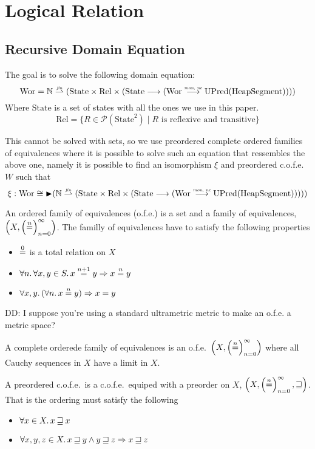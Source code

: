 \documentclass{article}
\newcommand{\finparfun}{\stackrel{\textit{\tiny{fin}}}{\rightharpoonup}}
\newcommand{\monnefun}{\stackrel{\textit{\tiny{mon, ne}}}{\longrightarrow}}
\newcommand{\fun}{\longrightarrow}
\newcommand{\nequal}[1][n]{\stackrel{\tiny{#1}}{=}}
\newcommand{\blater}{\mathop{\blacktriangleright}}
\newcommand{\powerset}[1]{\mathcal{P}(#1)}
\newcommand{\cofe}{c.o.f.e.}
\newcommand{\cofes}{\cofe{}'s}
\newcommand\dominique[1]{{\color{purple} \sf \footnotesize {DD: #1}}\\}
\newcommand{\future}{\mathbin{\sqsupseteq}}
\newcommand{\plaindom}[1]{\mathrm{#1}}
\newcommand{\HeapSegments}{\plaindom{HeapSegment}}
\newcommand{\nats}{\mathbb{N}}
\newcommand{\Rel}{\plaindom{Rel}}
\newcommand{\States}{\plaindom{State}}
\newcommand{\Wor}{\plaindom{Wor}}
\newcommand{\UPred}[1]{\plaindom{UPred}(#1)}
\begin{document}
\section{Logical Relation}
\label{sec:logical-relation}
\subsection{Recursive Domain Equation}
\label{subsec:recursive-dom-eq}
The goal is to solve the following domain equation:
\[
\Wor = \nats \finparfun (\States \times \Rel \times (\States \fun (\Wor \monnefun \UPred{\HeapSegments})))
\]
Where $\States$ is a set of states with all the ones we use in this paper.
\[
\Rel= \{R \in \powerset{\States^2} \mid R \text{ is reflexive and transitive} \}
\]

This cannot be solved with sets, so we use preordered complete ordered families of equivalences where it is possible to solve such an equation that ressembles the above one, namely it is possible to find an isomorphism $\xi$ and preordered \cofe{} $W$ such that
\[
  \xi : \Wor \cong \blater (\nats \finparfun (\States \times \Rel \times (\States \fun (\Wor \monnefun \UPred{\HeapSegments}))))
\]

\begin{definition}[o.f.e's]
  An ordered family of equivalences (o.f.e.) is a set and a family of equivalences, $\left(X, \left(\nequal\right)_{n=0}^{\infty} \right)$. The familly of equivalences have to satisfy the following properties
  \begin{itemize}
  \item $\nequal[0]$ is a total relation on $X$
  \item $\forall n \ldotp \forall x,y \in S \ldotp x \nequal[n+1] y \Rightarrow x \nequal y$
  \item $\forall x,y \ldotp(\forall n \ldotp x \nequal y) \Rightarrow x=y$
  \end{itemize}
\end{definition}

\dominique{I suppose you're using a standard ultrametric metric to make an
  o.f.e. a metric space?}
\begin{definition}[\cofes]
  A complete orderede family of equivalences is an o.f.e.\ $\left(X, \left(\nequal\right)_{n=0}^{\infty} \right)$ where all Cauchy sequences in $X$ have a limit in $X$.
\end{definition}

\begin{definition}[Preordered \cofes]
  A preordered \cofe{}\ is a \cofe{}\ equiped with a preorder on $X$, $\left(X, \left(\nequal\right)_{n=0}^{\infty}, \future \right)$. That is the ordering must satisfy the following
  \begin{itemize}
  \item $\forall x \in X \ldotp x \future x$
  \item $\forall x,y,z \in X \ldotp x \future y \land y \future z \Rightarrow x \future z$
  \end{itemize}
\end{definition}
\end{document}
